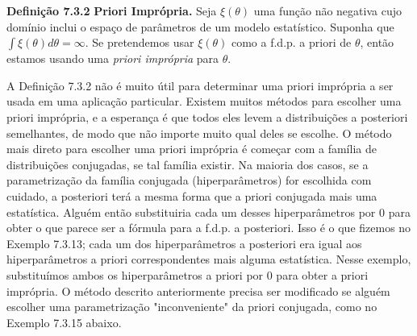 \noindent\textbf{Definição 7.3.2} \quad \textbf{Priori Imprópria.} Seja $\xi(\theta)$ uma função não negativa cujo domínio inclui o espaço de parâmetros de um modelo estatístico. Suponha que $\int \xi(\theta)d\theta = \infty$. Se pretendemos usar $\xi(\theta)$ como a f.d.p. a priori de $\theta$, então estamos usando uma \textit{priori imprópria} para $\theta$.

A Definição 7.3.2 não é muito útil para determinar uma priori imprópria a ser usada em uma aplicação particular. Existem muitos métodos para escolher uma priori imprópria, e a esperança é que todos eles levem a distribuições a posteriori semelhantes, de modo que não importe muito qual deles se escolhe. O método mais direto para escolher uma priori imprópria é começar com a família de distribuições conjugadas, se tal família existir. Na maioria dos casos, se a parametrização da família conjugada (hiperparâmetros) for escolhida com cuidado, a posteriori terá a mesma forma que a priori conjugada mais uma estatística. Alguém então substituiria cada um desses hiperparâmetros por 0 para obter o que parece ser a fórmula para a f.d.p. a posteriori. Isso é o que fizemos no Exemplo 7.3.13; cada um dos hiperparâmetros a posteriori era igual aos hiperparâmetros a priori correspondentes mais alguma estatística. Nesse exemplo, substituímos ambos os hiperparâmetros a priori por 0 para obter a priori imprópria. O método descrito anteriormente precisa ser modificado se alguém escolher uma parametrização "inconveniente" da priori conjugada, como no Exemplo 7.3.15 abaixo.

